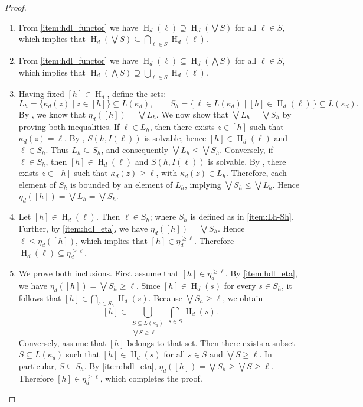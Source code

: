 \documentclass[10pt,a4paper]{amsart}
\DeclareMathOperator{\Ho}{H}
\begin{document}
\begin{proof}
\begin{enumerate}[label=(\roman*)]
\item From \cref{item:hdl_functor} we have \(\Ho_d(\ell) \supseteq \Ho_d \left(\bigvee S\right)\) for all \(\ell \in S\), which implies that \(\Ho_d(\bigvee S) \subseteq \bigcap_{\ell \in S} \Ho_d(\ell)\).

\item From \cref{item:hdl_functor} we have \(\Ho_d(\ell) \subseteq \Ho_d \left(\bigwedge S\right)\) for all \(\ell \in S\), which implies that \(\Ho_d(\bigwedge S) \supseteq \bigcup_{\ell \in S} \Ho_d(\ell)\).

\item\label{item:Lh-Sh} Having fixed \([h] \in \Ho_d\), define the sets:
\[
L_h = \big\{\kappa_d(z) \mid z \in [h]\big\} \subseteq L(\kappa_d), 
\qquad 
S_h = \big\{\, \ell \in L(\kappa_d) \mid [h] \in \Ho_d(\ell) \,\big\} \subseteq L(\kappa_d).
\]
By , we know that \(\eta_d([h])=\bigvee L_h\). We now show that \(\bigvee L_h = \bigvee S_h\) by proving both inequalities.
If \(\ell \in L_h\), then there exists \(z \in [h]\) such that \(\kappa_d(z) = \ell\). By , \(S(h,I(\ell))\) is solvable, hence \([h] \in \Ho_d(\ell)\) and \(\ell \in S_h\). Thus \(L_h \subseteq S_h\), and consequently \(\bigvee L_h \leq \bigvee S_h\). Conversely, if \(\ell \in S_h\), then \([h] \in \Ho_d(\ell)\) and \(S(h,I(\ell))\) is solvable. By , there exists \(z \in [h]\) such that \(\kappa_d(z) \geq \ell\), with \(\kappa_d(z) \in L_h\). Therefore, each element of \(S_h\) is bounded by an element of \(L_h\), implying \(\bigvee S_h \leq \bigvee L_h\). Hence \(\eta_d([h])=\bigvee L_h = \bigvee S_h\).
\item Let \([h] \in \Ho_d(\ell)\).
Then $\ell \in S_h$; where $S_h$ is defined as in \cref{item:Lh-Sh}. 
Further, by \cref{item:hdl_eta}, we have \(\eta_d([h])=\bigvee S_{h}\). Hence \(\ell \leq \eta_d([h])\), which implies that \([h] \in \eta_d^{\geq \ell}\). Therefore \(\Ho_d(\ell) \subseteq \eta_d^{\geq \ell}\).
\item We prove both inclusions. First assume that \([h] \in \eta_d^{\geq \ell}\).
By \cref{item:hdl_eta}, we have \(\eta_d([h])=\bigvee S_h \geq \ell\). Since \([h] \in \Ho_d(s)\) for every \(s \in S_h\), it follows that \([h] \in \bigcap_{s \in S_h} \Ho_d(s)\). Because \(\bigvee S_h \geq \ell\), we obtain
\[
[h] \in 
\bigcup_{\substack{S \subseteq L(\kappa_d) \\ \bigvee S \geq \ell}}
\bigcap_{s \in S} \Ho_d(s).
\]
Conversely, assume that \([h]\) belongs to that set.
Then there exists a subset \(S \subseteq L(\kappa_d)\) such that \([h] \in \Ho_d(s)\) for all \(s \in S\) and \(\bigvee S \geq \ell\).
In particular, $S \subseteq S_h$.
By \cref{item:hdl_eta},
\(\eta_d([h])= \bigvee S_h\geq \bigvee S\geq \ell.\)
Therefore \([h] \in \eta_d^{\geq \ell}\), which completes the proof. \qedhere
\end{enumerate}
\end{proof}
\end{document}
